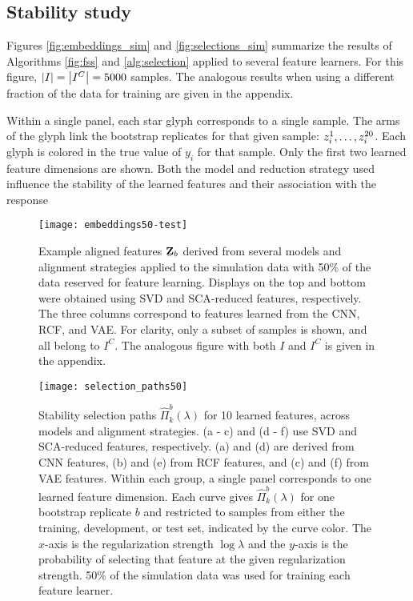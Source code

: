 \subsection{Stability study}

Figures \ref{fig:embeddings_sim} and \ref{fig:selections_sim} summarize the
results of Algorithms \ref{fig:fss} and \ref{alg:selection} applied to several
feature learners. For this figure, $\left|I\right| = \left|I^{C}\right| = 5000$ samples.
The analogous results when using a different fraction of the data for training
are given in the appendix.

Within a single panel, each star glyph corresponds to a single sample. The
arms of the glyph link the bootstrap replicates for that given sample:
$\protect z_{i}^{1}, \dots, z_{i}^{20}$. Each glyph is colored in the true
value of $y_{i}$ for that sample. Only the first two learned feature
dimensions are shown. Both the model and reduction strategy used influence
the stability of the learned features and their association with the response

\begin{figure}
  \centering
  \texttt{[image: embeddings50-test]}
  \caption{Example aligned features
    $\protect\underaccent{\bar}{\mathbf{Z}}_{b}$ derived from several models
    and alignment strategies applied to the simulation data with 50\% of the
    data reserved for feature learning. Displays on the top and bottom were
    obtained using SVD and SCA-reduced features, respectively. The three columns
    correspond to features learned from the CNN, RCF, and VAE. For clarity, only
    a subset of samples is shown, and all belong to $I^{C}$. The analogous
    figure with both $I$ and $I^{C}$ is given in the appendix.}
  \label{fig:embeddings50-test}
\end{figure}

\begin{figure}
  \centering
  \texttt{[image: selection\_paths50]}
  \caption{Stability selection paths $\hat{\Pi}_{k}^{b}\left(\lambda\right)$ for
    10 learned features, across models and alignment strategies. (a - c) and (d
    - f) use SVD and SCA-reduced features, respectively. (a) and (d) are derived
    from CNN features, (b) and (e) from RCF features, and (c) and (f) from VAE
    features. Within each group, a single panel corresponds to one learned
    feature dimension. Each curve gives $\hat{\Pi}_{k}^{b}\left(\lambda\right)$
    for one bootstrap replicate $b$ and restricted to samples from either the
    training, development, or test set, indicated by the curve color. The
    $x$-axis is the regularization strength $\log \lambda$ and the $y$-axis is
    the probability of selecting that feature at the given regularization
    strength. 50\% of the simulation data was used for training each feature
    learner.}
  \label{fig:selection_paths50}
\end{figure}

